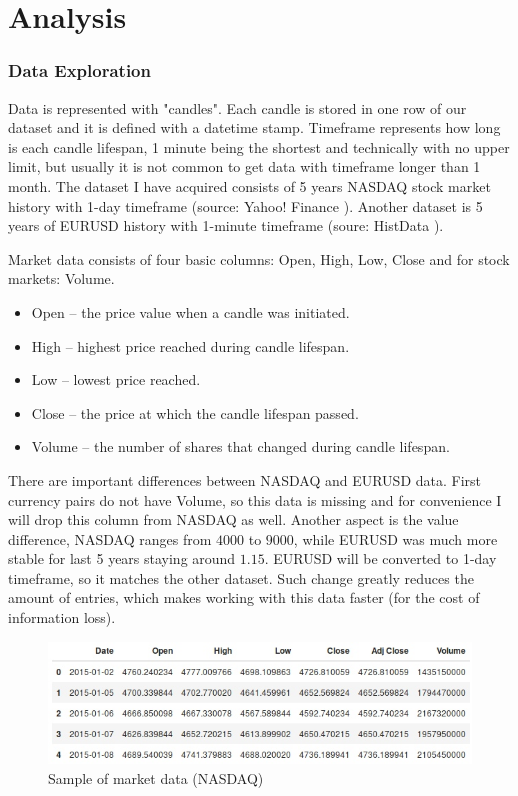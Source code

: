 \documentclass[a4paper,12pt]{article}
\begin{document}

\part{Analysis}
\section{Data Exploration}
Data is represented with "candles". Each candle is stored in one row of our dataset and it is defined with a datetime stamp. Timeframe represents how long is each candle lifespan, 1 minute being the shortest and technically with no upper limit, but usually it is not common to get data with timeframe longer than 1 month.
The dataset I have acquired consists of 5 years NASDAQ stock market history with 1-day timeframe (source: Yahoo! Finance \cite{Yahoo}). Another dataset is 5 years of EURUSD history with 1-minute timeframe (soure: HistData \cite{HistData}).

Market data consists of four basic columns: Open, High, Low, Close and for stock markets: Volume.

\begin{itemize}
	\item Open -- the price value when a candle was initiated.
	\item High -- highest price reached during candle lifespan.
	\item Low -- lowest price reached.
	\item Close -- the price at which the candle lifespan passed.
	\item Volume -- the number of shares that changed during candle lifespan.
\end{itemize}

There are important differences between NASDAQ and EURUSD data. First currency pairs do not have Volume, so this data is missing and for convenience I will drop this column from NASDAQ as well. Another aspect is the value difference, NASDAQ ranges from $4000$ to $9000$, while EURUSD was much more stable for last 5 years staying around $1.15$. EURUSD will be converted to 1-day timeframe, so it matches the other dataset. Such change greatly reduces the amount of entries, which makes working with this data faster (for the cost of information loss).

\begin{figure}[h]
	\includegraphics[width=\textwidth]{nasdaqTable}
	\caption{Sample of market data (NASDAQ)}
	\centering
\end{figure}
\end{document}
